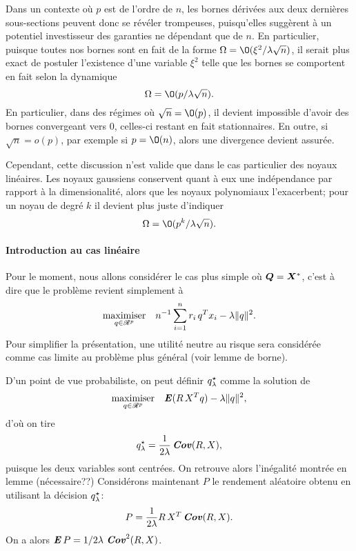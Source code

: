 Dans un contexte où $p$ est de l'ordre de $n$, les bornes dérivées aux deux dernières
sous-sections peuvent donc se révéler trompeuses, puisqu'elles suggèrent à un potentiel
investisseur des garanties ne dépendant que de $n$. En particulier, puisque toutes nos
bornes sont en fait de la forme $\Omega = \O(\xi^2/\lambda\sqrt{n})$, il serait plus exact de postuler
l'existence d'une variable $\xi^2$ telle que les bornes se comportent en fait selon la
dynamique
\begin{equation}
  \Omega = \O(p/\lambda\sqrt{n}).
\end{equation}
En particulier, dans des régimes où $\sqrt{n}=\O(p)$, il devient impossible d'avoir des
bornes convergeant vers 0, celles-ci restant en fait stationnaires. En outre, si
$\sqrt{n}=o(p)$, par exemple si $p=\O(n)$, alors une divergence devient assurée.

Cependant, cette discussion n'est valide que dans le cas particulier des noyaux
linéaires. Les noyaux gaussiens conservent quant à eux une indépendance par rapport à la
dimensionalité, alors que les noyaux polynomiaux l'exacerbent; pour un noyau de degré $k$
il devient plus juste d'indiquer
\begin{equation}
  \Omega = \O(p^k/\lambda\sqrt{n}).
\end{equation}


\paragraph{Introduction au cas linéaire}

Pour le moment, nous allons considérer le cas plus simple où $\Q = \X^*$, c'est à dire que
le problème revient simplement à 
\begin{equation}
  \maximizeEquation[q \in \Re^p]{n^{-1}\sumi r_i\,q^Tx_i - \lambda\|q\|^2.}
\end{equation}
Pour simplifier la présentation, une utilité neutre au risque sera considérée comme cas
limite au problème plus général (voir lemme de borne\cit).

D'un point de vue probabiliste, on peut définir $\qsh$ comme la solution de
\begin{equation}
  \maximizeEquation[q \in \Re^p]{\E(R\,X^Tq) - \lambda\|q\|^2,}
\end{equation}
d'où on tire
\begin{equation}
  q^\star_\lambda = \frac{1}{2\lambda}\Cov(R,X),
\end{equation}
puisque les deux variables sont centrées. On retrouve alors l'inégalité montrée en lemme
\cit (nécessaire??)
Considérons maintenant $P$ le rendement aléatoire obtenu en utilisant la décision $\qsh$:
\begin{equation}
  P = \frac{1}{2\lambda}R\,X^T\Cov(R,X).
\end{equation}
On a alors $\E P = 1/2\lambda\,\Cov^2(R,X)$.

